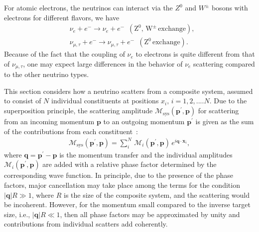 For atomic electrons, the neutrinos can interact via the $Z^0$ and $W^\pm$ bosons with electrons for different flavors, we have
\begin{align}
&\nu_e+e^-\longrightarrow\nu_e+e^-\,\,\,(\mathrm{Z^0,\,W^\pm\,exchange}),\\
&\nu_{\mu,\tau}+e^-\longrightarrow\nu_{\mu,\tau}+e^-\,\,\,(\mathrm{Z^0\,exchange}).
\end{align}
Because of the fact that the coupling of $\nu_e$ to electrons is quite different from that of $\nu_{\mu,\tau}$, one may expect large differences in the behavior of $\nu_e$ scattering compared to the other neutrino types.


This section considers how a neutrino scatters from a composite system, assumed to consist of $N$ individual constituents at positions $x_i,\,i=1,2,....N$. Due to the superposition principle, the scattering amplitude $\mathcal{M}_\mathrm{sys}(\mathbf{p}^\prime,\mathbf{p})$ for scattering from an incoming momentum $\mathbf{p}$ to an outgoing momentum $\mathbf{p}^\prime$ is given as the sum of the contributions from each constituent~\cite{Freedman:1977xn,Papavassiliou:2005cs}:
\begin{align}
\mathcal{M}_\mathrm{sys}(\mathbf{p}^\prime,\mathbf{p})=\sum_i^N\,\mathcal{M}_i(\mathbf{p}^\prime,\mathbf{p})\,e^{i\mathbf{q}\cdot\mathbf{x}_i},
\end{align}
where $\mathbf{q}=\mathbf{p}^\prime-\mathbf{p}$ is the momentum transfer and the individual amplitudes $\mathcal{M}_i(\mathbf{p}^\prime,\mathbf{p})$ are added with a relative phase factor determined by the corresponding wave function. %
In principle, due to the presence of the phase factors, major cancellation may take place among the terms for the condition $|\mathbf{q}|R\gg1$, where $R$ is the size of the composite system, and the scattering would be incoherent. However, for the momentum small compared to the inverse target size, i.e., $|\mathbf{q}|R\ll1$, then all phase factors may be approximated by unity and contributions from individual scatters add coherently. 


